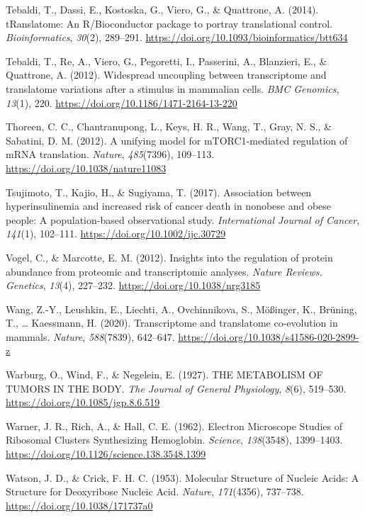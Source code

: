 \documentclass[12pt,openany]{book}
\begin{document}
\hypertarget{ref-Tebaldi2014}{}
Tebaldi, T., Dassi, E., Kostoska, G., Viero, G., \& Quattrone, A.
(2014). tRanslatome: An R/Bioconductor package to portray translational
control. \emph{Bioinformatics}, \emph{30}(2), 289--291.
\url{https://doi.org/10.1093/bioinformatics/btt634}

\hypertarget{ref-Tebaldi2012}{}
Tebaldi, T., Re, A., Viero, G., Pegoretti, I., Passerini, A., Blanzieri,
E., \& Quattrone, A. (2012). Widespread uncoupling between transcriptome
and translatome variations after a stimulus in mammalian cells.
\emph{BMC Genomics}, \emph{13}(1), 220.
\url{https://doi.org/10.1186/1471-2164-13-220}

\hypertarget{ref-Thoreen2012}{}
Thoreen, C. C., Chantranupong, L., Keys, H. R., Wang, T., Gray, N. S.,
\& Sabatini, D. M. (2012). A unifying model for mTORC1-mediated
regulation of mRNA translation. \emph{Nature}, \emph{485}(7396),
109--113. \url{https://doi.org/10.1038/nature11083}

\hypertarget{ref-Tsujimoto2017}{}
Tsujimoto, T., Kajio, H., \& Sugiyama, T. (2017). Association between
hyperinsulinemia and increased risk of cancer death in nonobese and
obese people: A population-based observational study.
\emph{International Journal of Cancer}, \emph{141}(1), 102--111.
\url{https://doi.org/10.1002/ijc.30729}

\hypertarget{ref-Vogel2012}{}
Vogel, C., \& Marcotte, E. M. (2012). Insights into the regulation of
protein abundance from proteomic and transcriptomic analyses.
\emph{Nature Reviews. Genetics}, \emph{13}(4), 227--232.
\url{https://doi.org/10.1038/nrg3185}

\hypertarget{ref-Wang2020}{}
Wang, Z.-Y., Leushkin, E., Liechti, A., Ovchinnikova, S., Mößinger, K.,
Brüning, T., \ldots{} Kaessmann, H. (2020). Transcriptome and
translatome co-evolution in mammals. \emph{Nature}, \emph{588}(7839),
642--647. \url{https://doi.org/10.1038/s41586-020-2899-z}

\hypertarget{ref-Warburg1927}{}
Warburg, O., Wind, F., \& Negelein, E. (1927). THE METABOLISM OF TUMORS
IN THE BODY. \emph{The Journal of General Physiology}, \emph{8}(6),
519--530. \url{https://doi.org/10.1085/jgp.8.6.519}

\hypertarget{ref-Warner1962a}{}
Warner, J. R., Rich, A., \& Hall, C. E. (1962). Electron Microscope
Studies of Ribosomal Clusters Synthesizing Hemoglobin. \emph{Science},
\emph{138}(3548), 1399--1403.
\url{https://doi.org/10.1126/science.138.3548.1399}

\hypertarget{ref-Watson1953}{}
Watson, J. D., \& Crick, F. H. C. (1953). Molecular Structure of Nucleic
Acids: A Structure for Deoxyribose Nucleic Acid. \emph{Nature},
\emph{171}(4356), 737--738. \url{https://doi.org/10.1038/171737a0}
\end{document}

